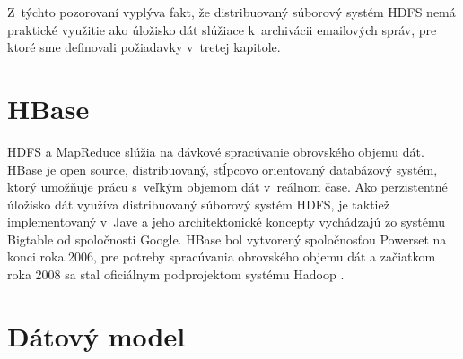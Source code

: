\documentclass[11pt,twoside,a4paper]{book}
\begin{document}
Z~týchto pozorovaní vyplýva fakt, že distribuovaný súborový systém HDFS nemá praktické využitie ako úložisko dát slúžiace k~archivácii emailových správ, pre ktoré sme definovali požiadavky v~tretej kapitole. %
% 
% 



\section*{HBase}


HDFS a MapReduce slúžia na dávkové spracúvanie obrovského objemu dát. HBase je open source, distribuovaný, stĺpcovo orientovaný databázový systém, ktorý umožňuje prácu s~veľkým objemom dát v~reálnom čase. Ako perzistentné úložisko dát využíva distribuovaný súborový systém HDFS, je taktiež implementovaný v~Jave a jeho architektonické koncepty vychádzajú zo systému Bigtable od spoločnosti Google. HBase bol vytvorený spoločnosťou Powerset na konci roka 2006, pre potreby spracúvania obrovského objemu dát a začiatkom roka 2008 sa stal oficiálnym podprojektom systému Hadoop \cite{White:2009:HDG:1717298}.

\section{Dátový model}
\end{document}
